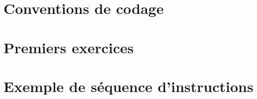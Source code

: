 

\usepackage{parcolumns}
\setlength{\parindent}{0pt}

 

\section{Conventions de codage}



\section{Premiers exercices}


\section{Exemple de séquence d'instructions}



